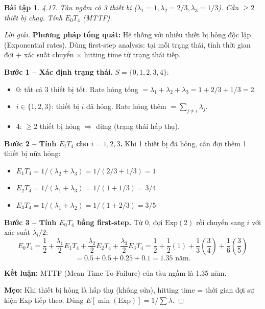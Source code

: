 \documentclass[8pt,a4paper]{article}
\newtheorem{exercise}{Bài tập}
\newenvironment{solution}{\begin{proof}[Lời giải]}{\end{proof}}
\begin{document}
\begin{exercise}
4.17. Tàu ngầm có 3 thiết bị ($\lambda_1=1, \lambda_2=2/3, \lambda_3=1/3$). Cần $\ge 2$ thiết bị chạy. Tính $E_0 T_4$ (MTTF).
\end{exercise}
\begin{solution}
\textbf{Phương pháp tổng quát:} Hệ thống với nhiều thiết bị hỏng độc lập (Exponential rates). Dùng first-step analysis: tại mỗi trạng thái, tính thời gian đợi + xác suất chuyển $\times$ hitting time từ trạng thái tiếp.

\textbf{Bước 1 -- Xác định trạng thái.} $S = \{0, 1, 2, 3, 4\}$:
\begin{itemize}[nosep]
\item 0: tất cả 3 thiết bị tốt. Rate hỏng tổng $= \lambda_1 + \lambda_2 + \lambda_3 = 1 + 2/3 + 1/3 = 2$.
\item $i \in \{1,2,3\}$: thiết bị $i$ đã hỏng. Rate hỏng thêm $= \sum_{j \neq i} \lambda_j$.
\item 4: $\ge 2$ thiết bị hỏng $\Rightarrow$ dừng (trạng thái hấp thụ).
\end{itemize}

\textbf{Bước 2 -- Tính $E_i T_4$ cho $i = 1, 2, 3$.} Khi 1 thiết bị đã hỏng, cần đợi thêm 1 thiết bị nữa hỏng:
\begin{itemize}[nosep]
\item $E_1 T_4 = 1/(\lambda_2+\lambda_3) = 1/(2/3+1/3) = 1$
\item $E_2 T_4 = 1/(\lambda_1+\lambda_3) = 1/(1+1/3) = 3/4$
\item $E_3 T_4 = 1/(\lambda_1+\lambda_2) = 1/(1+2/3) = 3/5$
\end{itemize}

\textbf{Bước 3 -- Tính $E_0 T_4$ bằng first-step.} Từ 0, đợi $\text{Exp}(2)$ rồi chuyển sang $i$ với xác suất $\lambda_i/2$:
\[
E_0 T_4 = \frac{1}{2} + \frac{\lambda_1}{2} E_1 T_4 + \frac{\lambda_2}{2} E_2 T_4 + \frac{\lambda_3}{2} E_3 T_4
= \frac{1}{2} + \frac{1}{2}(1) + \frac{1}{3}\left(\frac{3}{4}\right) + \frac{1}{6}\left(\frac{3}{5}\right)
\]
\[
= 0.5 + 0.5 + 0.25 + 0.1 = \boxed{1.35 \text{ năm}}.
\]

\textbf{Kết luận:} MTTF (Mean Time To Failure) của tàu ngầm là 1.35 năm.

\textbf{Mẹo:} Khi thiết bị hỏng là hấp thụ (không sửa), hitting time = thời gian đợi sự kiện Exp tiếp theo. Dùng $E[\min(\text{Exp})] = 1/\sum \lambda$.
\end{solution}
\end{document}
